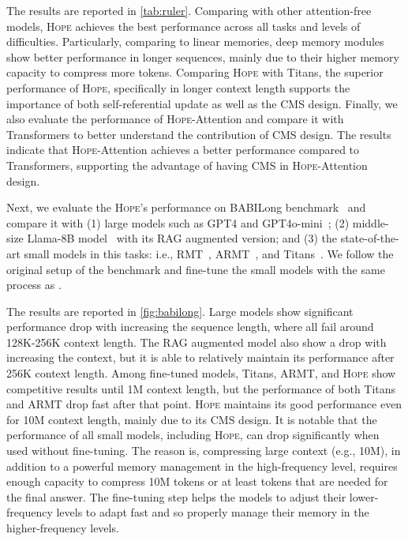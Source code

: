 \documentclass{article}
\newcommand{\citep}{\parencite}
\newcommand{\citet}{\textcite}
\newcommand{\head}[1]{\vspace{1.7mm}\noindent{{\textcolor{c4}{\bf #1.}}}}
\newcommand{\model}[0]{\textsc{Hope}}
\begin{document}
{The results are reported in \autoref{tab:ruler}. Comparing with other attention-free models, \model{} achieves the best performance across all tasks and levels of difficulties. Particularly, comparing to linear memories, deep memory modules show better performance in longer sequences, mainly due to their higher memory capacity to compress more tokens. Comparing \model{} with Titans, the superior performance of \model, specifically in longer context length supports the importance of both self-referential update as well as the CMS design. Finally, we also evaluate the performance of \model-Attention and compare it with Transformers to better understand the contribution of CMS design. The results indicate that \model-Attention achieves a better performance compared to Transformers, supporting the advantage of having CMS in \model-Attention design. 

\head{BABILong} Next, we evaluate the \model's performance on BABILong benchmark~\citep{kuratov2024babilong} and compare it with (1) large models such as GPT4 and GPT4o-mini~\citep{achiam2023gpt}; (2) middle-size Llama-8B model~\citep{dubey2024llama} with its RAG augmented version; and (3) the state-of-the-art small models in this tasks: i.e., RMT~\citep{bulatov2022recurrent}, ARMT~\citep{rodkin2024associative}, and Titans~\citep{behrouz2024titans}. We follow the original setup of the benchmark and fine-tune the small models with the same process as \citet{kuratov2024babilong}. 

The results are reported in \autoref{fig:babilong}. Large models show significant performance drop with increasing the sequence length, where all fail around 128K-256K context length. The RAG augmented model also show a drop with increasing the context, but it is able to relatively maintain its performance after 256K context length. Among fine-tuned models, Titans, ARMT, and \model{} show competitive results until 1M context length, but the performance of both Titans and ARMT drop fast after that point. \model{} maintains its good performance even for 10M context length, mainly due to its CMS design. It is notable that the performance of all small models, including \model, can drop significantly when used without fine-tuning. The reason is, compressing large context (e.g., 10M), in addition to a powerful memory management in the high-frequency level, requires enough capacity to compress 10M tokens or at least tokens that are needed for the final answer. The fine-tuning step helps the models to adjust their lower-frequency levels to adapt fast and so properly manage their memory in the higher-frequency levels.   

}
\end{document}
